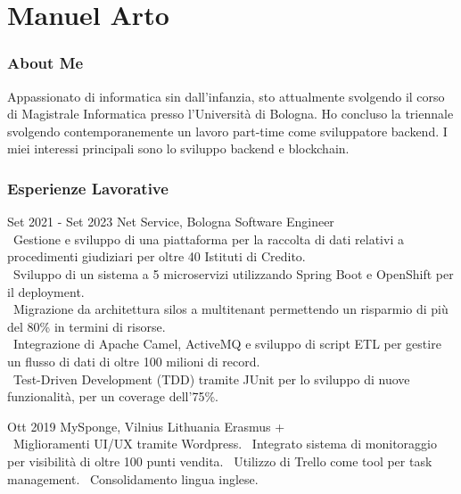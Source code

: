 \documentclass{tccv}
\begin{document}
\part{Manuel Arto}

\section{About Me}

Appassionato di informatica sin dall'infanzia, sto attualmente svolgendo il corso di Magistrale Informatica presso l'Università di Bologna. Ho concluso la triennale svolgendo contemporanemente un lavoro part-time come sviluppatore backend. I miei interessi principali sono lo sviluppo backend e blockchain.

\section{Esperienze Lavorative}

\begin{eventlist}

\item{Set 2021 - Set 2023}
     {Net Service, Bologna}
     {Software Engineer} \\
     \textbullet~Gestione e sviluppo di una piattaforma per la raccolta di dati relativi a procedimenti giudiziari per oltre 40 Istituti di Credito. \\
     \textbullet~Sviluppo di un sistema a 5 microservizi utilizzando Spring Boot e OpenShift per il deployment. \\
     \textbullet~Migrazione da architettura silos a multitenant permettendo un risparmio di più del 80\% in termini di risorse. \\
     \textbullet~Integrazione di Apache Camel, ActiveMQ e sviluppo di script ETL per gestire un flusso di dati di oltre 100 milioni di record. \\
     \textbullet~Test-Driven Development (TDD) tramite JUnit per lo sviluppo di nuove funzionalità, per un coverage dell'75\%.

\item{Ott 2019}
     {MySponge, Vilnius Lithuania}
     {Erasmus +} \\
     \textbullet~Miglioramenti UI/UX tramite Wordpress. \newline
     \textbullet~Integrato sistema di monitoraggio per visibilità di oltre 100 punti vendita. \newline
     \textbullet~Utilizzo di Trello come tool per task management. \newline
     \textbullet~Consolidamento lingua inglese.
\end{eventlist}
\end{document}
